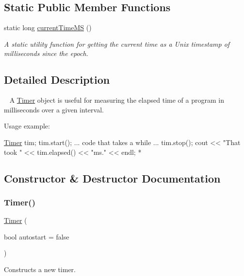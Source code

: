 \subsection*{Static Public Member Functions}
\begin{DoxyCompactItemize}
\item 
static long \mbox{\hyperlink{classTimer_a15da52f140db2287f84e933d49314a11}{current\+Time\+MS}} ()
\begin{DoxyCompactList}\small\item\em A static utility function for getting the current time as a Unix timestamp of milliseconds since the epoch. \end{DoxyCompactList}\end{DoxyCompactItemize}


\subsection{Detailed Description}
~\newline
 A \mbox{\hyperlink{classTimer}{Timer}} object is useful for measuring the elapsed time of a program in milliseconds over a given interval. 

Usage example\+:


\begin{DoxyPre}
  \mbox{\hyperlink{classTimer}{Timer}} tim;
  tim.start();
  ... code that takes a while ...
  tim.stop();
  cout << "That took " << tim.elapsed() << "ms." << endl;
*\end{DoxyPre}
 

\subsection{Constructor \& Destructor Documentation}
\mbox{\label{classTimer_a706556016b105bfe8459770ee1540dd9}} 
\subsubsection{\texorpdfstring{Timer()}{Timer()}}
{\footnotesize\ttfamily \mbox{\hyperlink{classTimer}{Timer}} (\begin{DoxyParamCaption}\item[{bool}]{autostart = {\ttfamily false} }\end{DoxyParamCaption})}



Constructs a new timer. 

